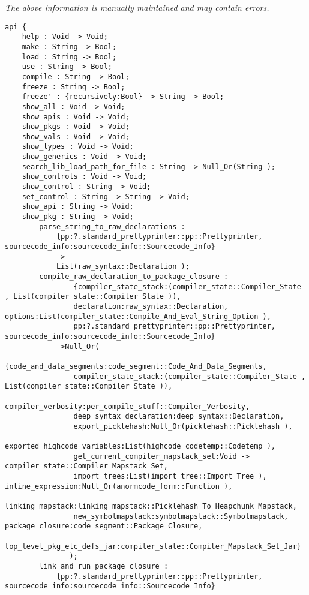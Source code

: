 \label{api:Makelib}

{\tiny \it The above information is manually maintained and may contain errors.}
\begin{verbatim}
api {
    help : Void -> Void;
    make : String -> Bool;
    load : String -> Bool;
    use : String -> Bool;
    compile : String -> Bool;
    freeze : String -> Bool;
    freeze' : {recursively:Bool} -> String -> Bool;
    show_all : Void -> Void;
    show_apis : Void -> Void;
    show_pkgs : Void -> Void;
    show_vals : Void -> Void;
    show_types : Void -> Void;
    show_generics : Void -> Void;
    search_lib_load_path_for_file : String -> Null_Or(String );
    show_controls : Void -> Void;
    show_control : String -> Void;
    set_control : String -> String -> Void;
    show_api : String -> Void;
    show_pkg : String -> Void;
        parse_string_to_raw_declarations :
            {pp:?.standard_prettyprinter::pp::Prettyprinter, sourcecode_info:sourcecode_info::Sourcecode_Info}
            ->
            List(raw_syntax::Declaration );
        compile_raw_declaration_to_package_closure :
                {compiler_state_stack:(compiler_state::Compiler_State , List(compiler_state::Compiler_State )),
                declaration:raw_syntax::Declaration, options:List(compiler_state::Compile_And_Eval_String_Option ),
                pp:?.standard_prettyprinter::pp::Prettyprinter, sourcecode_info:sourcecode_info::Sourcecode_Info}
            ->Null_Or(
                {code_and_data_segments:code_segment::Code_And_Data_Segments,
                compiler_state_stack:(compiler_state::Compiler_State , List(compiler_state::Compiler_State )),
                compiler_verbosity:per_compile_stuff::Compiler_Verbosity,
                deep_syntax_declaration:deep_syntax::Declaration,
                export_picklehash:Null_Or(picklehash::Picklehash ),
                exported_highcode_variables:List(highcode_codetemp::Codetemp ),
                get_current_compiler_mapstack_set:Void -> compiler_state::Compiler_Mapstack_Set,
                import_trees:List(import_tree::Import_Tree ), inline_expression:Null_Or(anormcode_form::Function ),
                linking_mapstack:linking_mapstack::Picklehash_To_Heapchunk_Mapstack,
                new_symbolmapstack:symbolmapstack::Symbolmapstack, package_closure:code_segment::Package_Closure,
                top_level_pkg_etc_defs_jar:compiler_state::Compiler_Mapstack_Set_Jar}
               );
        link_and_run_package_closure :
            {pp:?.standard_prettyprinter::pp::Prettyprinter, sourcecode_info:sourcecode_info::Sourcecode_Info}

\end{verbatim}
